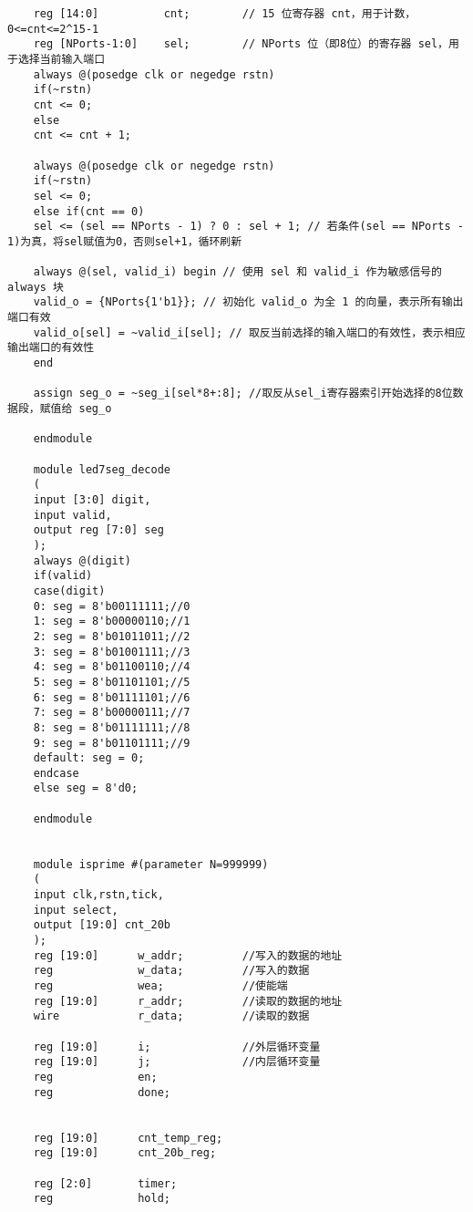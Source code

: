 \begin{lstlisting}
	reg [14:0]          cnt;        // 15 位寄存器 cnt，用于计数，0<=cnt<=2^15-1
	reg [NPorts-1:0]    sel;        // NPorts 位（即8位）的寄存器 sel，用于选择当前输入端口
	always @(posedge clk or negedge rstn) 
	if(~rstn) 
	cnt <= 0;
	else
	cnt <= cnt + 1;
	
	always @(posedge clk or negedge rstn) 
	if(~rstn)
	sel <= 0;
	else if(cnt == 0)
	sel <= (sel == NPorts - 1) ? 0 : sel + 1; // 若条件(sel == NPorts - 1)为真，将sel赋值为0，否则sel+1，循环刷新
	
	always @(sel, valid_i) begin // 使用 sel 和 valid_i 作为敏感信号的 always 块
	valid_o = {NPorts{1'b1}}; // 初始化 valid_o 为全 1 的向量，表示所有输出端口有效
	valid_o[sel] = ~valid_i[sel]; // 取反当前选择的输入端口的有效性，表示相应输出端口的有效性
	end
	
	assign seg_o = ~seg_i[sel*8+:8]; //取反从sel_i寄存器索引开始选择的8位数据段，赋值给 seg_o
	
	endmodule
	
	module led7seg_decode
	(
	input [3:0] digit,
	input valid,
	output reg [7:0] seg
	);
	always @(digit)
	if(valid)
	case(digit)
	0: seg = 8'b00111111;//0
	1: seg = 8'b00000110;//1
	2: seg = 8'b01011011;//2
	3: seg = 8'b01001111;//3
	4: seg = 8'b01100110;//4
	5: seg = 8'b01101101;//5
	6: seg = 8'b01111101;//6
	7: seg = 8'b00000111;//7
	8: seg = 8'b01111111;//8
	9: seg = 8'b01101111;//9
	default: seg = 0;
	endcase
	else seg = 8'd0;
	
	endmodule
	
	
	module isprime #(parameter N=999999)
	(
	input clk,rstn,tick,
	input select,
	output [19:0] cnt_20b
	);
	reg [19:0]      w_addr;	        //写入的数据的地址
	reg             w_data;	        //写入的数据
	reg             wea;	        //使能端
	reg [19:0]      r_addr;         //读取的数据的地址
	wire            r_data;	        //读取的数据
	
	reg [19:0]      i;              //外层循环变量
	reg [19:0]      j;              //内层循环变量
	reg             en;
	reg             done;
	
	
	reg [19:0]      cnt_temp_reg;
	reg [19:0]      cnt_20b_reg;
	
	reg [2:0]       timer;
	reg             hold;
	

\end{lstlisting}
